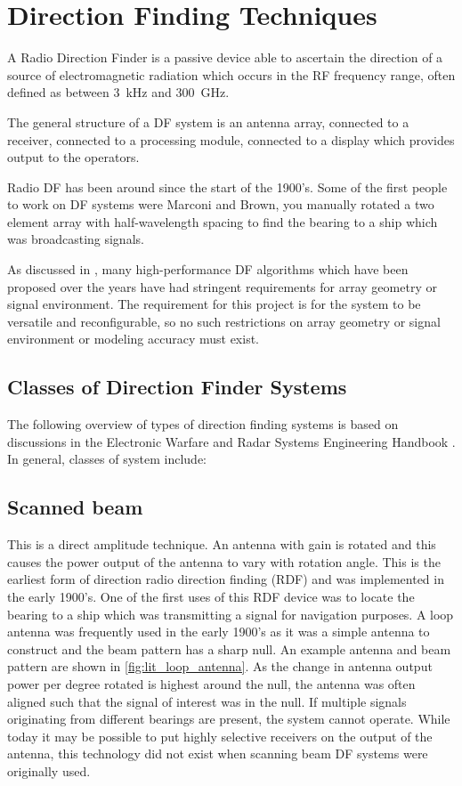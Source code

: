 \section{Direction Finding Techniques}
A Radio Direction Finder  is a passive device able to ascertain the direction of a source of electromagnetic radiation which occurs in the RF frequency range, often defined as between \SI{3}{\kilo\hertz} and \SI{300}{\giga\hertz}. 

The general structure of a DF system is an antenna array, connected to a receiver, connected to a processing module, connected to a display which provides output to the operators.

Radio DF has been around since the start of the 1900's. Some of the first people to work on DF  systems were Marconi and Brown, you manually rotated a two element array with half-wavelength spacing to find the bearing to a ship which was broadcasting signals. 

As discussed in \cite{farrier1990direction}, many high-performance DF algorithms which have been proposed over the years have had stringent requirements for array geometry or signal environment. The requirement for this project is for the system to be versatile and reconfigurable, so no such restrictions on array geometry or signal environment or modeling accuracy must exist. 

\subsection{Classes of Direction Finder Systems}
The following overview of types of direction finding systems is based on discussions in the Electronic Warfare and Radar Systems Engineering Handbook \cite{desk1997electronic}.
In general, classes of system include:

\subsection{Scanned beam}
This is a direct amplitude technique. An antenna with gain is rotated and this causes the power output of the antenna to vary with rotation angle. This is the earliest form of direction radio direction finding (RDF)  and was implemented in the early 1900's. One of the first uses of this RDF device was to locate the bearing to a ship which was transmitting a signal for navigation purposes. A loop antenna was frequently used in the early 1900's as it was a simple antenna to construct and the beam pattern has a sharp null. An example antenna and beam pattern are shown in \autoref{fig:lit_loop_antenna}. As the change in antenna output power per degree rotated is highest around the null, the antenna was often aligned such that the signal of interest was in the null. If multiple signals originating from different bearings are present, the system cannot operate. While today it may be possible to put highly selective receivers on the output of the antenna, this technology did not exist when scanning beam DF systems were originally used.

